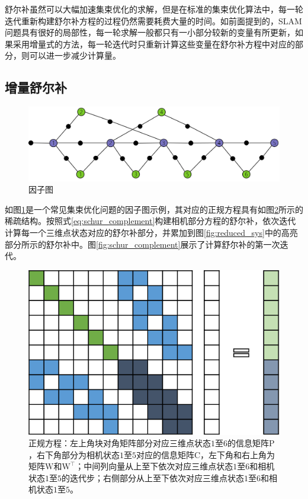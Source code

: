 舒尔补虽然可以大幅加速集束优化的求解，但是在标准的集束优化算法中，每一轮迭代重新构建舒尔补方程的过程仍然需要耗费大量的时间。如前面提到的，SLAM问题具有很好的局部性，每一轮求解一般都只有一小部分较新的变量有所更新，如果采用增量式的方法，每一轮迭代时只重新计算这些变量在舒尔补方程中对应的部分，则可以进一步减少计算量。

\subsection{增量舒尔补}

\begin{figure}[htb!]
    \centering
    \includegraphics[width=.8\textwidth]{figs/factor_graph.png}
    \caption{因子图}
    \label{fig:factor_graph}
\end{figure}

如图\ref{fig:factor_graph}是一个常见集束优化问题的因子图示例，其对应的正规方程具有如图\ref{fig:normal_eq}所示的稀疏结构。按照式\eqref{eq:schur_complement}构建相机部分方程的舒尔补，依次迭代计算每一个三维点状态对应的舒尔补部分，并累加到图\ref{fig:reduced_sys}中的高亮部分所示的舒尔补中。图\ref{fig:schur_complement}展示了计算舒尔补的第一次迭代。

\begin{figure}[htb!]
    \centering
    \includegraphics{figs/normal_eq.png}
    \caption{正规方程：左上角块对角矩阵部分对应三维点状态$1$至$6$的信息矩阵$\mathrm{P}$，右下角部分为相机状态$1$至$5$对应的信息矩阵$\mathrm{C}$，左下角和右上角为矩阵$\mathrm{W}$和$\mathrm{W}^\top$；中间列向量从上至下依次对应三维点状态$1$至$6$和相机状态$1$至$5$的迭代步；右侧部分从上至下依次对应三维点状态$1$至$6$和相机状态$1$至$5$。}
    \label{fig:normal_eq}
\end{figure}

